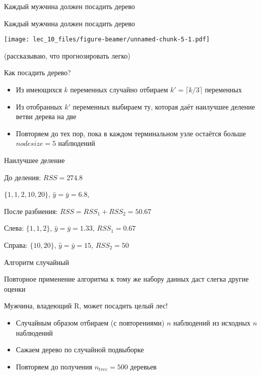 \documentclass[ignorenonframetext,]{beamer}
\newcommand{\hy}{\hat{y}}
\begin{document}
\begin{frame}{Каждый мужчина должен посадить дерево}
\end{frame}

\begin{frame}{Каждый мужчина должен посадить дерево}

\texttt{[image: lec\_10\_files/figure-beamer/unnamed-chunk-5-1.pdf]}

(рассказываю, что прогнозировать легко)

\end{frame}

\begin{frame}{Как посадить дерево?}

\begin{itemize}
\item
  Из имеющихся \(k\) переменных случайно отбираем
  \(k'=\lceil k/3 \rceil\) переменных
\item
  Из отобранных \(k'\) переменных выбираем ту, которая даёт наилучшее
  деление ветви дерева на две
\item
  Повторяем до тех пор, пока в каждом терминальном узле остаётся больше
  \(nodesize=5\) наблюдений
\end{itemize}

\end{frame}

\begin{frame}{Наилучшее деление}

До деления: \(RSS=274.8\)

\(\{ 1, 1, 2, 10, 20\}\), \(\hy=\bar{y}=6.8\),

После разбиения: \(RSS=RSS_1+RSS_2=50.67\)

Слева: \(\{ 1, 1, 2 \}\), \(\hy=\bar{y}=1.33\), \(RSS_1=0.67\)

Справа: \(\{10,20\}\), \(\hy=\bar{y}=15\), \(RSS_2=50\)

\end{frame}

\begin{frame}{Алгоритм случайный}

Повторное применение алгоритма к тому же набору данных даст слегка
другие оценки

\end{frame}

\begin{frame}{Мужчина, владеющий R, может посадить целый лес!}

\begin{itemize}
\item
  Случайным образом отбираем (с повторениями) \(n\) наблюдений из
  исходных \(n\) наблюдений
\item
  Сажаем дерево по случайной подвыборке
\item
  Повторяем до получения \(n_{tree}=500\) деревьев
\end{itemize}

\end{frame}
\end{document}

